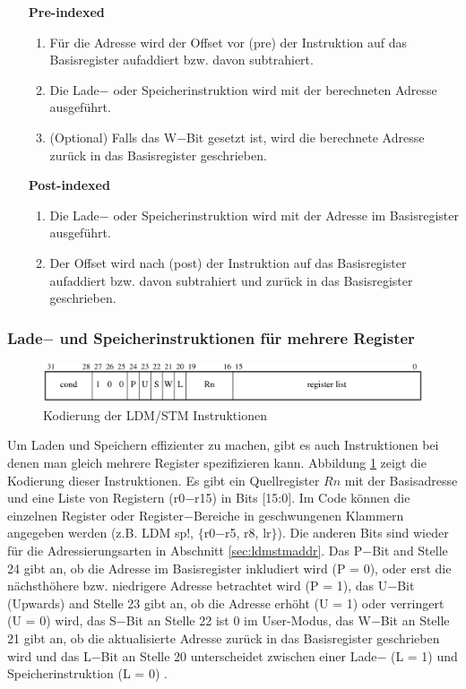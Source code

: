 \documentclass[a4paper, 11pt, onecolumn]{article}
\begin{document}
\begin{itemize}[labelwidth=7.5em,leftmargin =\dimexpr{}+\relax, align=parleft]
\item[\textbf{Pre-indexed}]
\begin{enumerate}[labelindent=0em,labelsep=0.5cm,leftmargin=*]
\item Für die Adresse wird der Offset vor (pre) der Instruktion auf das Basisregister aufaddiert bzw. davon subtrahiert.
\item Die Lade$-$ oder Speicherinstruktion wird mit der berechneten Adresse ausgeführt.
\item (Optional) Falls das W$-$Bit gesetzt ist, wird die berechnete Adresse zurück in das Basisregister geschrieben.
\end{enumerate}
\item[\textbf{Post-indexed}]
\begin{enumerate}[labelindent=0em,labelsep=0.5cm,leftmargin=*]
\item Die Lade$-$ oder Speicherinstruktion wird mit der Adresse im Basisregister ausgeführt.
\item Der Offset wird nach (post) der Instruktion auf das Basisregister aufaddiert bzw. davon subtrahiert und zurück in das Basisregister geschrieben.
\end{enumerate}
\end{itemize}

\subsubsection{Lade$-$ und Speicherinstruktionen für mehrere Register}

\begin{figure}[!htb]
\centering
\includegraphics[width=1\textwidth]{data/ldmstm}
\caption[Kodierung LDM/STM]{Kodierung der LDM/STM Instruktionen \cite{arm:2005}}
\label{fig:ldmstm}
\end{figure}

Um Laden und Speichern effizienter zu machen, gibt es auch Instruktionen bei denen man gleich mehrere Register spezifizieren kann. Abbildung \ref{fig:ldmstm} zeigt die Kodierung dieser Instruktionen. Es gibt ein Quellregister $Rn$ mit der Basisadresse und eine Liste von Registern (r0$-$r15) in Bits $[$15:0$]$. Im Code können die einzelnen Register oder Register$-$Bereiche in geschwungenen Klammern angegeben werden (z.B. LDM sp!, $\lbrace$r0$-$r5, r8, lr$\rbrace$). Die anderen Bits sind wieder für die Adressierungsarten in Abschnitt \ref{sec:ldmstmaddr}. Das P$-$Bit and Stelle 24 gibt an, ob die Adresse im Basisregister inkludiert wird (P = 0), oder erst die nächsthöhere bzw. niedrigere Adresse betrachtet wird (P = 1), das U$-$Bit (Upwards) and Stelle 23 gibt an, ob die Adresse erhöht (U = 1) oder verringert (U = 0) wird, das S$-$Bit an Stelle 22 ist 0 im User-Modus, das W$-$Bit an Stelle 21 gibt an, ob die aktualisierte Adresse zurück in das Basisregister geschrieben wird und das L$-$Bit an Stelle 20 unterscheidet zwischen einer Lade$-$ (L = 1) und Speicherinstruktion (L = 0) \cite{arm:2005}.
\end{document}
